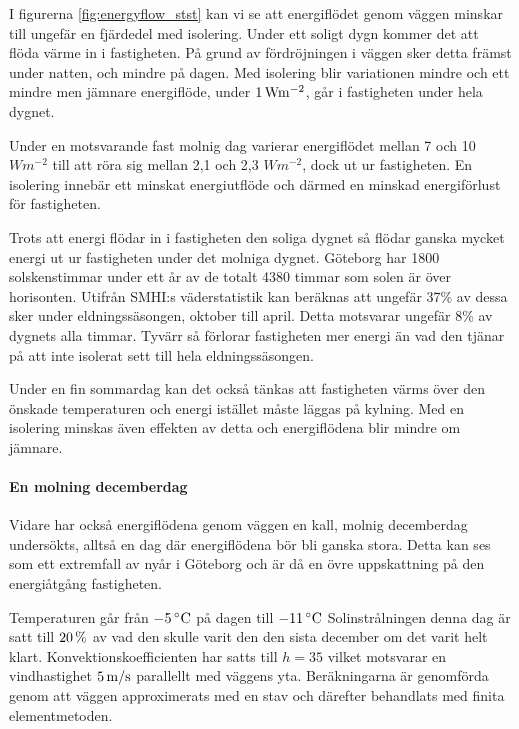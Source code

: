 I figurerna \ref{fig:energyflow_stst} kan vi se att energiflödet genom väggen minskar till 
ungefär en fjärdedel med isolering. Under ett soligt dygn kommer det att flöda värme in i
 fastigheten. På grund av fördröjningen i väggen sker detta främst under natten, 
 och mindre på dagen. Med isolering blir variationen mindre och ett mindre men jämnare 
 energiflöde, under $\unit[1]{W m^{-2}}$, går i fastigheten under hela dygnet.

Under en motsvarande fast molnig dag varierar energiflödet mellan 7 och 10 
$\unit{W m^{-2}}$ till att röra sig mellan 2,1 och 2,3 $\unit{W m^{-2}}$, dock ut ur 
fastigheten. En isolering innebär ett minskat energiutflöde och därmed en minskad 
energiförlust för fastigheten.

Trots att energi flödar in i fastigheten den soliga dygnet så flödar ganska mycket energi 
ut ur fastigheten under det molniga dygnet. Göteborg har 1800 solskenstimmar under ett
 år av de totalt 4380 timmar som solen är över horisonten. Utifrån SMHI:s väderstatistik \cite{SMHIdata}
 kan beräknas att ungefär 37\% av dessa sker under eldningssäsongen, oktober till april. 
 Detta motsvarar ungefär 8\% av dygnets alla timmar. Tyvärr så förlorar fastigheten mer 
 energi än vad den tjänar på att inte isolerat sett till hela eldningssäsongen.

Under en fin sommardag kan det också tänkas att fastigheten värms över den önskade 
temperaturen och energi istället måste läggas på kylning. Med en isolering minskas även 
effekten av detta och energiflödena blir mindre om jämnare.

\paragraph{En molning decemberdag}

Vidare har också energiflödena genom väggen en kall, molnig decemberdag undersökts, 
alltså en dag där energiflödena bör bli ganska stora. Detta kan ses som ett extremfall av
nyår i Göteborg och är då en övre uppskattning på den energiåtgång fastigheten.

 Temperaturen går från $\unit[-5]{^\circ C}$ på dagen till $\unit[-11]{^\circ C}$ 
 Solinstrålningen denna dag är satt till $\unit[20]{\%}$ av vad den skulle varit den den 
 sista december om det varit helt klart. Konvektionskoefficienten har satts till $h=35$ 
 vilket motsvarar en vindhastighet $\unit[5]{m/s}$ parallellt med väggens yta. 
 Beräkningarna är genomförda genom att väggen approximerats med en stav och 
 därefter behandlats med finita elementmetoden.


